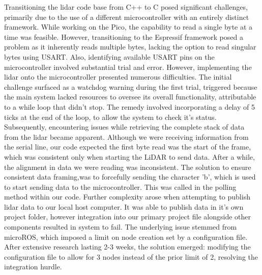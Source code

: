 \documentclass[conference]{IEEEtran}
\begin{document}
Transitioning the lidar code base from C++ to C posed significant challenges, primarily due to the use of a different microcontroller with an entirely distinct framework. While working on the Pico, the capability to read a single byte at a time was feasible. However, transitioning to the Espressif framework posed a problem as it inherently reads multiple bytes, lacking the option to read singular bytes using USART. Also, identifying available USART pins on the microcontroller involved substantial trial and error.
However, implementing the lidar onto the microcontroller presented numerous difficulties. The initial challenge surfaced as a watchdog warning during the first trial, triggered because the main system lacked resources to oversee its overall functionality, attributable to a while loop that didn't stop. The remedy involved incorporating a delay of 5 ticks at the end of the loop, to allow the system to check it’s status.
Subsequently, encountering issues while retrieving the complete stack of data from the lidar became apparent. Although we were receiving information from the serial line, our code expected the first byte read was the start of the frame, which was consistent only when starting the LiDAR to send data. After a while, the alignment in data we were reading was inconsistent. The solution to ensure consistent data framing,was to forcefully sending the character 'b', which is used to start sending data to the microcontroller. This was called in the polling method within our code.
Further complexity arose when attempting to publish lidar data to our local host computer. It was able to publish data in it’s own project folder, however integration into our primary project file alongside other components resulted in system to fail. The underlying issue stemmed from microROS, which imposed a limit on node creation set by a configuration file. After extensive research lasting 2-3 weeks, the solution emerged: modifying the configuration file to allow for 3 nodes instead of the prior limit of 2, resolving the integration hurdle.


\nocite{*}

\vspace{12pt}
\end{document}

